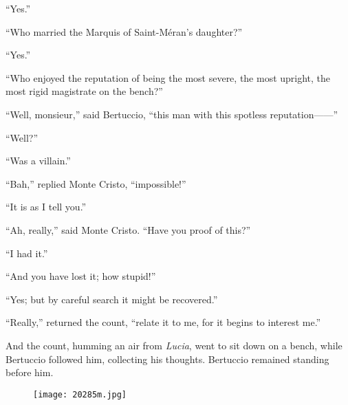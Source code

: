 “Yes.”

“Who married the Marquis of Saint-Méran’s daughter?”

“Yes.”

“Who enjoyed the reputation of being the most severe, the most upright,
the most rigid magistrate on the bench?”

“Well, monsieur,” said Bertuccio, “this man with this spotless
reputation——”

“Well?”

“Was a villain.”

“Bah,” replied Monte Cristo, “impossible!”

“It is as I tell you.”

“Ah, really,” said Monte Cristo. “Have you proof of this?”

“I had it.”

“And you have lost it; how stupid!”

“Yes; but by careful search it might be recovered.”

“Really,” returned the count, “relate it to me, for it begins to
interest me.”

And the count, humming an air from \textit{Lucia}, went to sit down on a
bench, while Bertuccio followed him, collecting his thoughts. Bertuccio
remained standing before him.

\begin{figure}[h]
\texttt{[image: 20285m.jpg]}
\end{figure}
